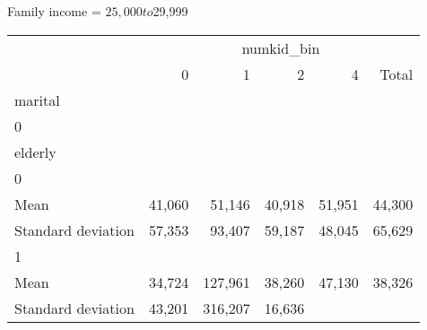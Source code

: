 Family income = $25,000 to $29,999
\begin{tabular}{llllll}
\cline{1-6}
\multicolumn{1}{c}{} &
  \multicolumn{5}{|c}{numkid\_bin} \\
\multicolumn{1}{c}{} &
  \multicolumn{1}{|r}{0} &
  \multicolumn{1}{r}{1} &
  \multicolumn{1}{r}{2} &
  \multicolumn{1}{r}{4} &
  \multicolumn{1}{r}{Total} \\
\cline{1-6}
\multicolumn{1}{l}{marital} &
  \multicolumn{1}{|r}{} &
  \multicolumn{1}{r}{} &
  \multicolumn{1}{r}{} &
  \multicolumn{1}{r}{} &
  \multicolumn{1}{r}{} \\
\multicolumn{1}{l}{\hspace{1em}0} &
  \multicolumn{1}{|r}{} &
  \multicolumn{1}{r}{} &
  \multicolumn{1}{r}{} &
  \multicolumn{1}{r}{} &
  \multicolumn{1}{r}{} \\
\multicolumn{1}{l}{\hspace{2em}elderly} &
  \multicolumn{1}{|r}{} &
  \multicolumn{1}{r}{} &
  \multicolumn{1}{r}{} &
  \multicolumn{1}{r}{} &
  \multicolumn{1}{r}{} \\
\multicolumn{1}{l}{\hspace{3em}0} &
  \multicolumn{1}{|r}{} &
  \multicolumn{1}{r}{} &
  \multicolumn{1}{r}{} &
  \multicolumn{1}{r}{} &
  \multicolumn{1}{r}{} \\
\multicolumn{1}{l}{\hspace{4em}Mean} &
  \multicolumn{1}{|r}{41,060} &
  \multicolumn{1}{r}{51,146} &
  \multicolumn{1}{r}{40,918} &
  \multicolumn{1}{r}{51,951} &
  \multicolumn{1}{r}{44,300} \\
\multicolumn{1}{l}{\hspace{4em}Standard deviation} &
  \multicolumn{1}{|r}{57,353} &
  \multicolumn{1}{r}{93,407} &
  \multicolumn{1}{r}{59,187} &
  \multicolumn{1}{r}{48,045} &
  \multicolumn{1}{r}{65,629} \\
\multicolumn{1}{l}{\hspace{3em}1} &
  \multicolumn{1}{|r}{} &
  \multicolumn{1}{r}{} &
  \multicolumn{1}{r}{} &
  \multicolumn{1}{r}{} &
  \multicolumn{1}{r}{} \\
\multicolumn{1}{l}{\hspace{4em}Mean} &
  \multicolumn{1}{|r}{34,724} &
  \multicolumn{1}{r}{127,961} &
  \multicolumn{1}{r}{38,260} &
  \multicolumn{1}{r}{47,130} &
  \multicolumn{1}{r}{38,326} \\
\multicolumn{1}{l}{\hspace{4em}Standard deviation} &
  \multicolumn{1}{|r}{43,201} &
  \multicolumn{1}{r}{316,207} &
  \multicolumn{1}{r}{16,636} &

\end{tabular}
